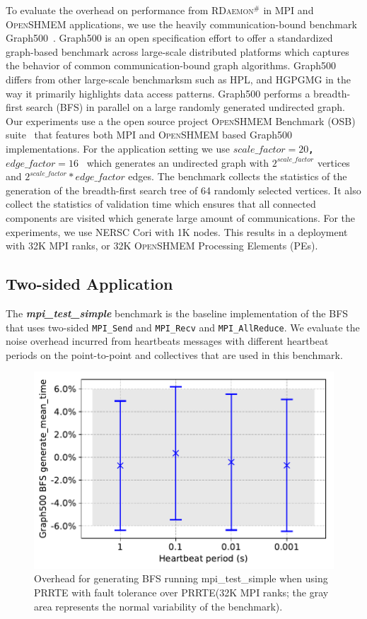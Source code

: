 \documentclass[5p,times,twocolumn]{elsarticle}
\newcommand{\mpifunc}[1]{\lstinline"MPI_#1"\xspace}
\newcommand{\prrte}[0]{\textsc{PRRTE}\xspace}
\newcommand{\mpi}[0]{\textsc{MPI}\xspace}
\newcommand{\oshmem}[0]{\textsc{OpenSHMEM}\xspace}
\newcommand{\ourwork}[0]{\textsc{RDaemon}\ensuremath{^\#}\xspace}
\begin{document}
To evaluate the overhead on performance from \ourwork
in \mpi and \oshmem applications, we use the heavily communication-bound benchmark Graph500~\cite{graph500}.
Graph500 is an open specification effort to offer a standardized graph-based
benchmark across large-scale distributed
platforms which captures the behavior of common communication-bound graph algorithms.
Graph500 differs from other large-scale
benchmarksm such as HPL, and HGPGMG in the way it primarily highlights data access patterns.
Graph500 performs a breadth-first search (BFS) in
parallel on a large randomly generated undirected graph. Our experiments use a
the open source project \oshmem Benchmark (OSB) suite~\cite{g500shmem} that features both \mpi and \oshmem based 
Graph500 implementations. For the application setting we use \texttt{\bf $scale\_factor = 20$, $edge\_factor = 16$ }
which generates an undirected graph with \texttt{\bf $2^{scale\_factor}$} vertices and
\texttt{\bf $2^{scale\_factor}*edge\_factor$} edges. The benchmark collects the statistics
of the generation of the breadth-first search tree of 64 randomly selected vertices. It also
collect the statistics of validation time which ensures that all connected components are visited
which generate large amount of communications. For the experiments, we use NERSC Cori with 1K nodes. This results in a deployment with 32K \mpi  ranks, or 32K \oshmem Processing Elements (PEs). 

\subsection{Two-sided Application}
The \textbf{\emph{mpi\_test\_simple}} benchmark  is the baseline implementation of the BFS that
uses two-sided \mpifunc{Send} and \mpifunc{Recv} and \mpifunc{AllReduce}.
We evaluate the noise overhead incurred from heartbeats messages with different heartbeat
periods on the point-to-point and collectives that are used in this benchmark.

\begin{figure}[h]
  \centering
  \includegraphics[width=\linewidth]{bfs_mean.pdf}
  \caption{Overhead for generating BFS running mpi\_test\_simple when using \prrte with fault tolerance over \prrte (32K \mpi ranks; the gray area represents the normal variability of the benchmark).}
  \label{fig:mean.bfs}
\end{figure}
\end{document}
